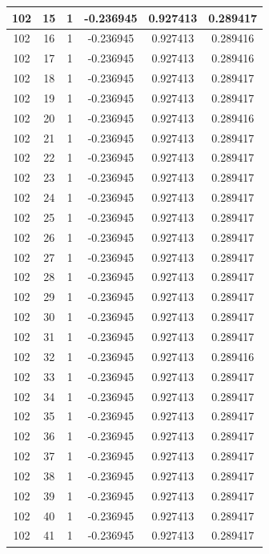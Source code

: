 \documentclass[12pt,a4paper]{article}
\numberwithin{equation}{section}
\numberwithin{figure}{section}
\numberwithin{table}{section}
\begin{document}
\begin{longtable}{|c|c|c|c|c|c|}
102 & 15 & 1 & -0.236945 & 0.927413 & 0.289417 \\ \hline
102 & 16 & 1 & -0.236945 & 0.927413 & 0.289416 \\ \hline
102 & 17 & 1 & -0.236945 & 0.927413 & 0.289416 \\ \hline
102 & 18 & 1 & -0.236945 & 0.927413 & 0.289417 \\ \hline
102 & 19 & 1 & -0.236945 & 0.927413 & 0.289417 \\ \hline
102 & 20 & 1 & -0.236945 & 0.927413 & 0.289416 \\ \hline
102 & 21 & 1 & -0.236945 & 0.927413 & 0.289417 \\ \hline
102 & 22 & 1 & -0.236945 & 0.927413 & 0.289417 \\ \hline
102 & 23 & 1 & -0.236945 & 0.927413 & 0.289417 \\ \hline
102 & 24 & 1 & -0.236945 & 0.927413 & 0.289417 \\ \hline
102 & 25 & 1 & -0.236945 & 0.927413 & 0.289417 \\ \hline
102 & 26 & 1 & -0.236945 & 0.927413 & 0.289417 \\ \hline
102 & 27 & 1 & -0.236945 & 0.927413 & 0.289417 \\ \hline
102 & 28 & 1 & -0.236945 & 0.927413 & 0.289417 \\ \hline
102 & 29 & 1 & -0.236945 & 0.927413 & 0.289417 \\ \hline
102 & 30 & 1 & -0.236945 & 0.927413 & 0.289417 \\ \hline
102 & 31 & 1 & -0.236945 & 0.927413 & 0.289417 \\ \hline
102 & 32 & 1 & -0.236945 & 0.927413 & 0.289416 \\ \hline
102 & 33 & 1 & -0.236945 & 0.927413 & 0.289417 \\ \hline
102 & 34 & 1 & -0.236945 & 0.927413 & 0.289417 \\ \hline
102 & 35 & 1 & -0.236945 & 0.927413 & 0.289417 \\ \hline
102 & 36 & 1 & -0.236945 & 0.927413 & 0.289417 \\ \hline
102 & 37 & 1 & -0.236945 & 0.927413 & 0.289417 \\ \hline
102 & 38 & 1 & -0.236945 & 0.927413 & 0.289417 \\ \hline
102 & 39 & 1 & -0.236945 & 0.927413 & 0.289417 \\ \hline
102 & 40 & 1 & -0.236945 & 0.927413 & 0.289417 \\ \hline
102 & 41 & 1 & -0.236945 & 0.927413 & 0.289417 \\ \hline

\end{longtable}
\end{document}
